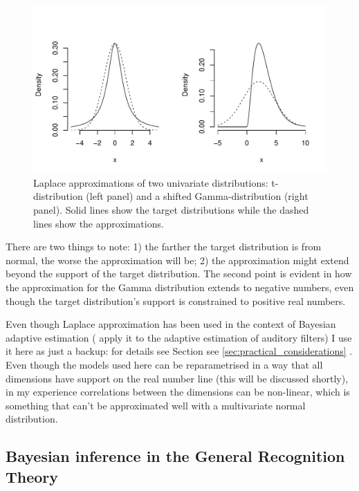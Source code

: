 \documentclass{article}\usepackage{knitr}
\begin{document}
\begin{figure}[!htb]
	\begin{center}
\begin{knitrout}
\color{fgcolor}
\includegraphics[width=\maxwidth]{figure/lapapp-1} 
\end{knitrout}
	\end{center}
	\caption{ Laplace approximations of two univariate distributions: t-distribution (left panel) and a shifted Gamma-distribution (right panel). Solid lines show the target distributions while the dashed lines show the approximations. }
	\label{fig:lapapp}
\end{figure}

There are two things to note: 1) the farther the target distribution is from normal, the worse the approximation will be; 2) the approximation might extend beyond the support of the target distribution. The second point is evident in how the approximation for the Gamma distribution extends to negative numbers, even though the target distribution's support is constrained to positive real numbers. 

Even though Laplace approximation has been used in the context of Bayesian adaptive estimation (\citet{shen2013} apply it to the adaptive estimation of auditory filters) I use it here as just a backup: for details see Section see \ref{sec:practical_considerations} \textit{}. Even though the models used here can be reparametrised in a way that all dimensions have support on the real number line (this will be discussed shortly), in my experience correlations between the dimensions can be non-linear, which is something that can't be approximated well with a multivariate normal distribution.

\subsection{Bayesian inference in the General Recognition Theory}
\label{sec:bayes_in_grt}
\end{document}
